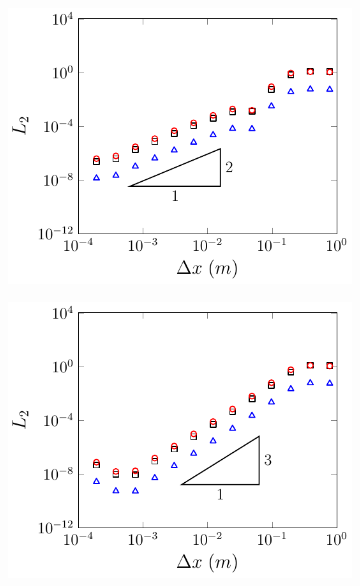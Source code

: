 \begin{figure}
\begin{subfigure}{0.5\textwidth}
		\vspace{0.5cm}
	\end{subfigure}
	\begin{subfigure}{0.5\textwidth}
		\includegraphics[width=\textwidth]{./chp5/figures/Analytic/Soliton/L2/FEVM2.pdf}
		\vspace{0.5cm}
	\end{subfigure}%
	\begin{subfigure}{0.5\textwidth}
		\includegraphics[width=\textwidth]{./chp5/figures/Analytic/Soliton/L2/FDVM3.pdf}

\end{subfigure}
\end{figure}

